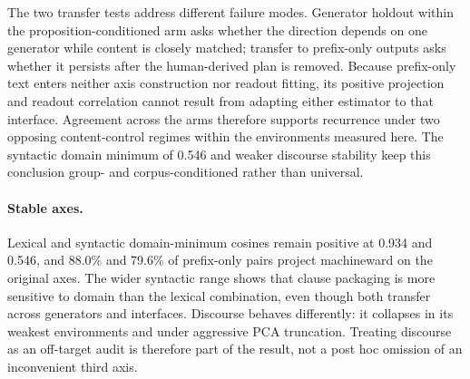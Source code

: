 The two transfer tests address different failure modes. Generator holdout within the proposition-conditioned arm asks whether the direction depends on one generator while content is closely matched; transfer to prefix-only outputs asks whether it persists after the human-derived plan is removed. Because prefix-only text enters neither axis construction nor readout fitting, its positive projection and readout correlation cannot result from adapting either estimator to that interface. Agreement across the arms therefore supports recurrence under two opposing content-control regimes within the environments measured here. The syntactic domain minimum of 0.546 and weaker discourse stability keep this conclusion group- and corpus-conditioned rather than universal.

\paragraph{Stable axes.} Lexical and syntactic domain-minimum cosines remain positive at 0.934 and 0.546, and 88.0\% and 79.6\% of prefix-only pairs project machineward on the original axes. The wider syntactic range shows that clause packaging is more sensitive to domain than the lexical combination, even though both transfer across generators and interfaces. Discourse behaves differently: it collapses in its weakest environments and under aggressive PCA truncation. Treating discourse as an off-target audit is therefore part of the result, not a post hoc omission of an inconvenient third axis.


